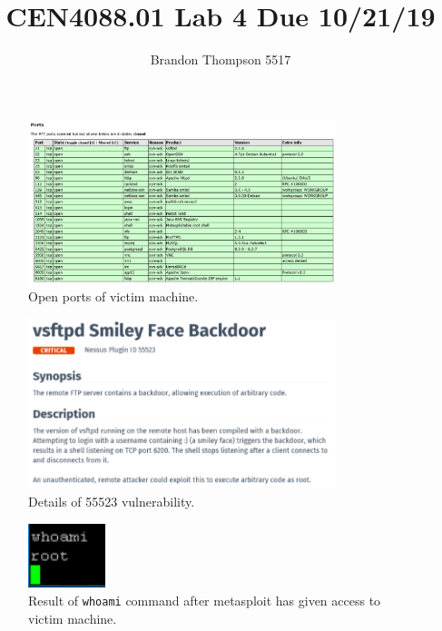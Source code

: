 \documentclass[a4paper]{article}
\begin{document}
	\title{CEN4088.01 Lab 4 Due 10/21/19}
	\author{Brandon Thompson 5517}
	\maketitle

	\begin{figure}[h!]
		\centering
		\includegraphics[width=0.8\textwidth]{1_1_16}
		\caption{Open ports of victim machine.}
		\label{fig:1}
	\end{figure}
	
	\begin{figure}[h!]
		\centering
		\includegraphics[width=0.8\textwidth]{1_2_21}
		\caption{Details of 55523 vulnerability.}
		\label{fig:2}
	\end{figure}

	\begin{figure}[h!]
		\centering
		\includegraphics[width=0.2\textwidth]{1_3_10}
		\caption{Result of \texttt{whoami} command after metasploit has given access to victim machine.}
		\label{fig:3}
	\end{figure}
\end{document}
